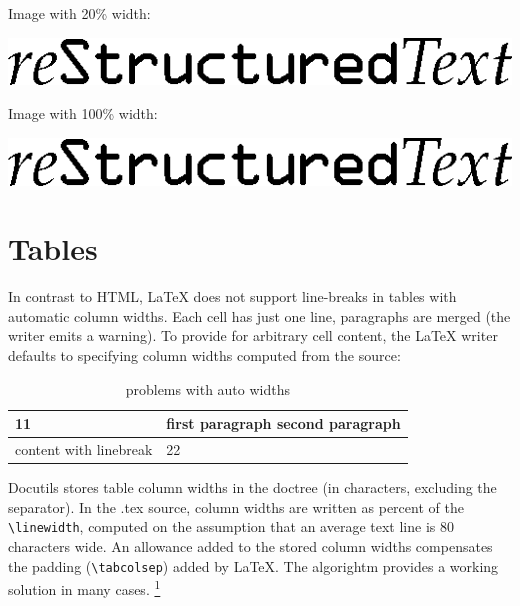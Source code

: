 \documentclass[a4paper]{article}
\providecommand*{\DUfootnotemark}[3]{%
  \raisebox{1em}{\hypertarget{#1}{}}%
  \hyperlink{#2}{\textsuperscript{#3}}%
}
\begin{document}
Image with 20\% width:

\includegraphics[width=0.200\linewidth]{../../../docs/user/rst/images/title.png}

Image with 100\% width:

\includegraphics[width=1.000\linewidth]{../../../docs/user/rst/images/title.png}


\section{Tables%
  \label{tables}%
}

In contrast to HTML, LaTeX does not support line-breaks in tables with
\textquotedbl{}automatic\textquotedbl{} column widths. Each cell has just one line, paragraphs are
merged (the writer emits a warning).
To provide for arbitrary cell content, the LaTeX writer defaults to
specifying column widths computed from the source:

\begin{longtable}{|l|l|}
\caption{problems with \textquotedbl{}auto\textquotedbl{} widths}\\
\hline
11 & first paragraph
second paragraph \\
\hline
content
with
linebreak & 22 \\
\hline
\end{longtable}

Docutils stores table column widths in the \textquotedbl{}doctree\textquotedbl{} (in characters,
excluding the separator). In the .tex source, column widths are written
as percent of the \texttt{\textbackslash{}linewidth}, computed on the assumption that an
average text line is 80 characters wide. An allowance added to the stored
column widths compensates the padding (\texttt{\textbackslash{}tabcolsep}) added by LaTeX.
The algorightm provides a working solution in many cases.\DUfootnotemark{footnote-reference-1}{footnote-1}{1}
\end{document}
